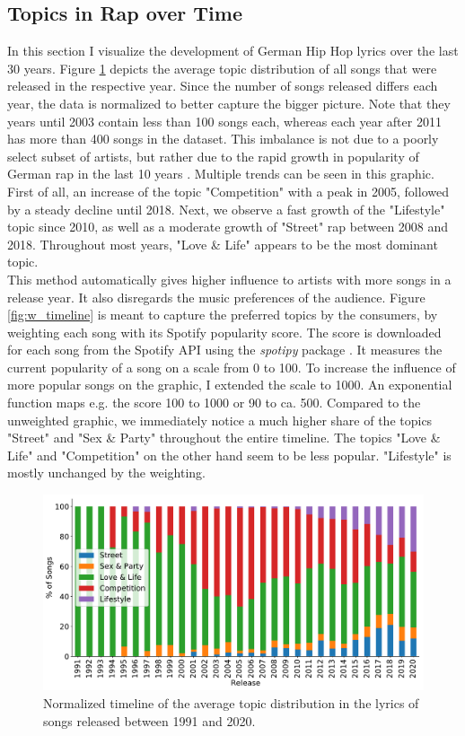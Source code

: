 \documentclass[conference]{IEEEtran}
\begin{document}
\subsection{Topics in Rap over Time}
In this section I visualize the development of German Hip Hop lyrics over the last 30 years. Figure \ref{fig:timeline} depicts the average topic distribution of all songs that were released in the respective year. Since the number of songs released differs each year, the data is normalized to better capture the bigger picture. Note that they years until 2003 contain less than 100 songs each, whereas each year after 2011 has more than 400 songs in the dataset. This imbalance is not due to a poorly select subset of artists, but rather due to the rapid growth in popularity of German rap in the last 10 years \cite{musikindustrie}. Multiple trends can be seen in this graphic. First of all, an increase of the topic "Competition" with a peak in 2005, followed by a steady decline until 2018. Next, we observe a fast growth of the "Lifestyle" topic since 2010, as well as a moderate growth of "Street" rap between 2008 and 2018. Throughout most years, "Love \& Life" appears to be the most dominant topic.\\
This method automatically gives higher influence to artists with more songs in a release year. It also disregards the music preferences of the audience. Figure \ref{fig:w_timeline} is meant to capture the preferred topics by the consumers, by weighting each song with its Spotify popularity score. The score is downloaded for each song from the Spotify API using the \textit{spotipy} package \cite{spotipy}. It measures the current popularity of a song on a scale from 0 to 100. To increase the influence of more popular songs on the graphic, I extended the scale to 1000. An exponential function maps e.g. the score 100 to 1000 or 90 to ca. 500. Compared to the unweighted graphic, we immediately notice a much higher share of the topics "Street" and "Sex \& Party" throughout the entire timeline. The topics "Love \& Life" and "Competition" on the other hand seem to be less popular. "Lifestyle" is mostly unchanged by the weighting.

\begin{figure}[!t]
\includegraphics[width=\linewidth]{figures/timeline.pdf}
\vspace*{-8mm}
\caption{Normalized timeline of the average topic distribution in the lyrics of songs released between 1991 and 2020.}
\label{fig:timeline}
\end{figure}
\end{document}
